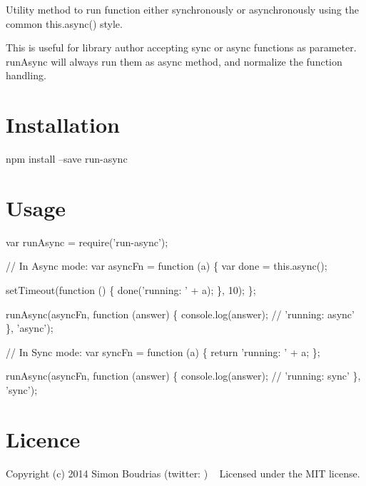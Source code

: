\href{http://badge.fury.io/js/run-async}{\tt } \href{http://travis-ci.org/SBoudrias/run-async}{\tt } \href{https://david-dm.org/SBoudrias/run-async}{\tt }

Utility method to run function either synchronously or asynchronously using the common {\ttfamily this.\+async()} style.

This is useful for library author accepting sync or async functions as parameter. {\ttfamily run\+Async} will always run them as async method, and normalize the function handling.

\section*{Installation }


\begin{DoxyCode}
npm install --save run-async
\end{DoxyCode}


\section*{Usage }


\begin{DoxyCode}
var runAsync = require('run-async');

// In Async mode:
var asyncFn = function (a) \{
  var done = this.async();

  setTimeout(function () \{
    done('running: ' + a);
  \}, 10);
\};

runAsync(asyncFn, function (answer) \{
  console.log(answer); // 'running: async'
\}, 'async');

// In Sync mode:
var syncFn = function (a) \{
  return 'running: ' + a;
\};

runAsync(asyncFn, function (answer) \{
  console.log(answer); // 'running: sync'
\}, 'sync');
\end{DoxyCode}


\section*{Licence }

Copyright (c) 2014 Simon Boudrias (twitter\+: ) ~\newline
Licensed under the M\+IT license. 